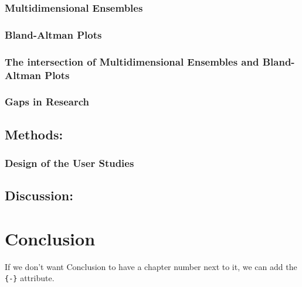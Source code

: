 \documentclass[print]{nuthesis}
\begin{document}
\hypertarget{multidimensional-ensembles-1}{%
\subsection{Multidimensional Ensembles}\label{multidimensional-ensembles-1}}

\hypertarget{bland-altman-plots}{%
\subsection{Bland-Altman Plots}\label{bland-altman-plots}}

\hypertarget{the-intersection-of-multidimensional-ensembles-and-bland-altman-plots}{%
\subsection{The intersection of Multidimensional Ensembles and Bland-Altman Plots}\label{the-intersection-of-multidimensional-ensembles-and-bland-altman-plots}}

\hypertarget{gaps-in-research}{%
\subsection{Gaps in Research}\label{gaps-in-research}}

\hypertarget{methods}{%
\section{Methods:}\label{methods}}

\hypertarget{design-of-the-user-studies}{%
\subsection{Design of the User Studies}\label{design-of-the-user-studies}}

\hypertarget{discussion-1}{%
\section{Discussion:}\label{discussion-1}}

\hypertarget{conclusion}{%
\chapter*{Conclusion}\label{conclusion}}

If we don't want Conclusion to have a chapter number next to it, we can add the \texttt{\{-\}} attribute.
\end{document}
